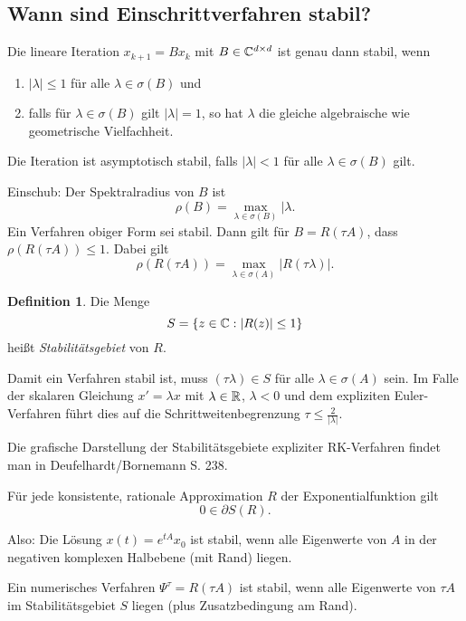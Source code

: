 \documentclass[
 a4paper,
 12pt,
 parskip=half
 ]{scrreprt}
\theoremstyle{plain}
\theoremstyle{definition}
\numberwithin{rmrk}{chapter}
\numberwithin{defn}{chapter}
\numberwithin{exmp}{chapter}
\numberwithin{prgp}{subsection}
\newtheorem*{defn*}{Definition}
\numberwithin{equation}{chapter}
\begin{document}
\subsection{Wann sind Einschrittverfahren stabil?} %
\begin{thm}
  Die lineare Iteration $x_{k+1} = B x_k$ mit $B \in \mathbb{C}^{d \times d}$ ist genau
  dann stabil, wenn
  \begin{enumerate}
  \item $| \lambda | \le 1$ für alle $\lambda \in \sigma(B)$ und
  \item falls für $\lambda \in \sigma(B)$ gilt $| \lambda | = 1$, so hat $\lambda$
    die gleiche algebraische wie geometrische Vielfachheit.
  \end{enumerate}
  Die Iteration ist asymptotisch stabil, falls $|\lambda| < 1$ für alle $\lambda
  \in \sigma(B)$ gilt.
\end{thm}

Einschub: Der Spektralradius von $B$ ist
\[ \rho(B) = \max_{\lambda \in \sigma(B)} | \lambda. \]
Ein Verfahren obiger Form sei stabil. Dann gilt für $B = R(\tau A)$, dass
$\rho(R(\tau A)) \le 1$. Dabei gilt
\[ \rho( R(\tau A)) = \max_{\lambda \in \sigma(A)} |R(\tau \lambda)|. \]

\begin{defn*}
  Die Menge
  \[ S = \{ z \in \mathbb{C} : |R(z)| \le 1 \} \]
  heißt \emph{Stabilitätsgebiet} von $R$.
\end{defn*}

Damit ein Verfahren stabil ist, muss $(\tau \lambda) \in S$ für alle $\lambda
\in \sigma(A)$ sein. Im Falle der skalaren Gleichung $x' = \lambda x$ mit
$\lambda \in \mathbb{R}$, $\lambda < 0$ und dem expliziten Euler-Verfahren führt dies
auf die Schrittweitenbegrenzung $\tau \le \frac{2}{|\lambda|}$.

Die grafische Darstellung der Stabilitätsgebiete expliziter RK-Verfahren findet
man in Deufelhardt/Bornemann S. 238.

\begin{lem} %
  Für jede konsistente, rationale Approximation $R$ der Exponentialfunktion gilt
  \[ 0 \in \partial S(R). \]
\end{lem}

Also: Die Lösung $x(t) = e^{tA} x_0$ ist stabil, wenn alle Eigenwerte von $A$ in
der negativen komplexen Halbebene (mit Rand) liegen.

Ein numerisches Verfahren $\Psi^\tau = R(\tau A)$ ist stabil, wenn alle
Eigenwerte von $\tau A$ im Stabilitätsgebiet $S$ liegen (plus Zusatzbedingung am
Rand).
\end{document}
